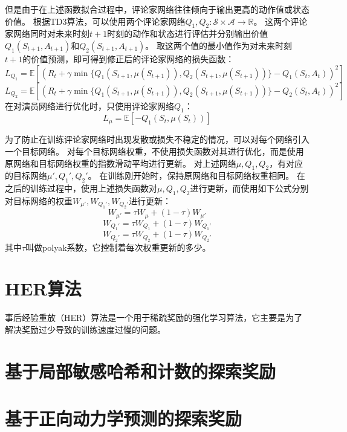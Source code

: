     但是由于在上述函数拟合过程中，评论家网络往往倾向于输出更高的动作值或状态价值。
    根据TD3算法\cite{DBLP:journals/corr/abs-1802-09477}，可以使用两个评论家网络$Q_1,Q_2:\mathcal S\times\mathcal A\to \mathbb R$。
    这两个评论家网络同时对未来时刻$t+1$时刻的动作和状态进行评估并分别输出价值$Q_1(S_{t+1},A_{t+1})$和$Q_2(S_{t+1},A_{t+1})$。
    取这两个值的最小值作为对未来时刻$t+1$的价值预测，即可得到修正后的评论家网络的损失函数：
    $$L_{Q_1} = \mathbb E[(R_t + \gamma \min\{ Q_1(S_{t+1},\mu(S_{t+1})), Q_2(S_{t+1},\mu(S_{t+1})) \} - Q_1(S_t, A_t))^2]$$
    $$L_{Q_2} = \mathbb E[(R_t + \gamma \min\{ Q_1(S_{t+1},\mu(S_{t+1})), Q_2(S_{t+1},\mu(S_{t+1})) \} - Q_2(S_t, A_t))^2]$$
    在对演员网络进行优化时，只使用评论家网络$Q_1$：
    $$L_\mu = \mathbb E[-Q_1(S_t, \mu(S_t))]$$

    为了防止在训练评论家网络时出现发散或损失不稳定的情况，可以对每个网络引入一个目标网络。
    对每个目标网络权重，不使用损失函数对其进行优化，而是使用原网络和目标网络权重的指数滑动平均进行更新。
    对上述网络$\mu, Q_1, Q_2$，有对应的目标网络$\mu',Q_1',Q_2'$。
    在训练刚开始时，保持原网络和目标网络权重相同。
    在之后的训练过程中，使用上述损失函数对$\mu, Q_1, Q_2$进行更新，而使用如下公式分别对目标网络的权重$W_{\mu'},W_{Q_1'}, W_{Q_2'}$进行更新：
    $$W_{\mu'} = \tau W_\mu + (1-\tau) W_{\mu'}$$
    $$W_{Q_1'} = \tau W_{Q_1} + (1-\tau) W_{Q_1'}$$
    $$W_{Q_2'} = \tau W_{Q_2} + (1-\tau) W_{Q_2'}$$
    其中$\tau$叫做polyak系数，它控制着每次权重更新的多少。

    \section{HER算法}
    事后经验重放（HER）算法是一个用于稀疏奖励的强化学习算法，它主要是为了解决奖励过少导致的训练速度过慢的问题。

    \section{基于局部敏感哈希和计数的探索奖励}

    \section{基于正向动力学预测的探索奖励}
